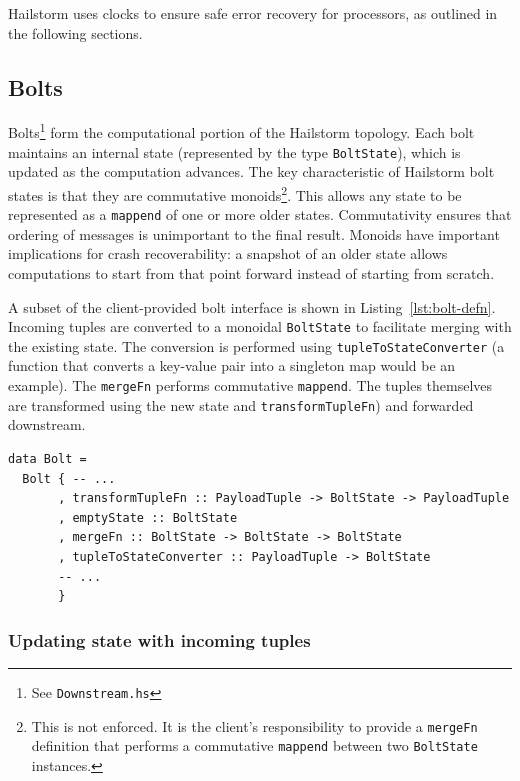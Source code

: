 \documentclass[10pt,nocopyrightspace]{sigplanconf}
\begin{document}
Hailstorm uses clocks to ensure safe error recovery for processors, 
as outlined in the following sections.

\subsection{Bolts}
\label{sec:bolts}

Bolts\footnote{See \texttt{Downstream.hs}} form the computational portion of
the Hailstorm topology. Each bolt maintains an internal state (represented by
the type \lstinline{BoltState}), which is updated as the computation advances.
The key characteristic of Hailstorm bolt states is that they are commutative
monoids\footnote{This is not enforced. It is the client's responsibility to
  provide a \lstinline{mergeFn} definition that performs a commutative
  \lstinline{mappend} between two \lstinline{BoltState} instances.}.  This
  allows any state to be represented as a \lstinline{mappend} of one or more
  older states. Commutativity ensures that ordering of messages is unimportant
  to the final result. Monoids have important implications for crash recoverability:
  a snapshot of an older state allows computations to start 
  from that point forward instead of starting from scratch.

A subset of the client-provided bolt interface is shown in
Listing~\ref{lst:bolt-defn}. Incoming tuples are converted to a monoidal
\lstinline{BoltState} to facilitate merging with the existing state. The
conversion is performed using \lstinline{tupleToStateConverter} (a function
that converts a key-value pair into a singleton map would be an example). The
\lstinline{mergeFn} performs commutative \lstinline{mappend}. The tuples
themselves are transformed using the new state and
\lstinline{transformTupleFn}) and forwarded downstream.

\begin{lstlisting}[caption=Client interface for a
bolt,label=lst:bolt-defn,float]
data Bolt =
  Bolt { -- ...
       , transformTupleFn :: PayloadTuple -> BoltState -> PayloadTuple
       , emptyState :: BoltState
       , mergeFn :: BoltState -> BoltState -> BoltState
       , tupleToStateConverter :: PayloadTuple -> BoltState
       -- ...
       }
\end{lstlisting}

\subsubsection{Updating state with incoming tuples}
\label{sec:updating-state}
\end{document}
